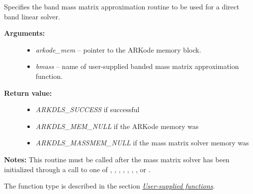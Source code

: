 \documentclass[letterpaper,10pt,english]{sphinxmanual}
\begin{document}
\begin{fulllineitems}
\label{c_interface/User_callable:ARKDlsSetBandMassFn}
Specifies the band mass matrix approximation routine to be
used for a direct band linear solver.
\begin{description}
\item[{\textbf{Arguments:}}] \leavevmode\begin{itemize}
\item {} 
\emph{arkode\_mem} -- pointer to the ARKode memory block.

\item {} 
\emph{bmass} -- name of user-supplied banded mass matrix approximation function.

\end{itemize}

\item[{\textbf{Return value:}}] \leavevmode\begin{itemize}
\item {} 
\emph{ARKDLS\_SUCCESS}  if successful

\item {} 
\emph{ARKDLS\_MEM\_NULL}  if the ARKode memory was 

\item {} 
\emph{ARKDLS\_MASSMEM\_NULL} if the mass matrix solver memory was 

\end{itemize}

\end{description}

\textbf{Notes:} This routine must be called after the mass matrix solver
has been initialized through a call to one of
{\hyperref[c_interface/User_callable:ARKMassDense]{}}, {\hyperref[c_interface/User_callable:ARKMassLapackDense]{}},
{\hyperref[c_interface/User_callable:ARKMassBand]{}}, {\hyperref[c_interface/User_callable:ARKMassLapackBand]{}},
{\hyperref[c_interface/User_callable:ARKMassSpgmr]{}}, {\hyperref[c_interface/User_callable:ARKMassSpbcg]{}},
{\hyperref[c_interface/User_callable:ARKMassSptfqmr]{}}, {\hyperref[c_interface/User_callable:ARKMassSpfgmr]{}} or
{\hyperref[c_interface/User_callable:ARKMassPcg]{}}.

The function type {\hyperref[c_interface/User_supplied:ARKDlsBandMassFn]{}} is described in the section
{\hyperref[c_interface/User_supplied:cinterface-usersupplied]{\emph{User-supplied functions}}}.

\end{fulllineitems}
\end{document}
